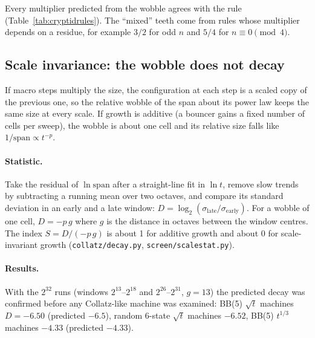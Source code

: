 \documentclass[11pt,a4paper]{article}
\begin{document}
Every multiplier predicted from the wobble agrees with the rule (Table~\ref{tab:cryptidrules}).
The ``mixed'' teeth come from rules whose multiplier depends on a residue, for example $3/2$ for
odd $n$ and $5/4$ for $n \equiv 0 \pmod 4$.

\subsection{Scale invariance: the wobble does not decay}
If macro steps multiply the size, the configuration at each step is a scaled copy of the previous
one, so the relative wobble of the span about its power law keeps the same size at every scale.
If growth is additive (a bouncer gains a fixed number of cells per sweep), the wobble is about one
cell and its relative size falls like $1/\mathrm{span} \propto t^{-p}$.

\paragraph{Statistic.} Take the residual of $\ln\mathrm{span}$ after a straight-line fit in
$\ln t$, remove slow trends by subtracting a running mean over two octaves, and compare its
standard deviation in an early and a late window: $D = \log_2(\sigma_\text{late}/\sigma_\text{early})$.
For a wobble of one cell, $D = -p\,g$ where $g$ is the distance in octaves between the window
centres. The index $S = D/(-p\,g)$ is about 1 for additive growth and about 0 for scale-invariant
growth (\texttt{collatz/decay.py}, \texttt{screen/scalestat.py}).

\paragraph{Results.} With the $2^{32}$ runs (windows $2^{13}$--$2^{18}$ and $2^{26}$--$2^{31}$,
$g = 13$) the predicted decay was confirmed before any Collatz-like machine was examined: BB(5)
$\sqrt t$ machines $D = -6.50$ (predicted $-6.5$), random 6-state $\sqrt t$ machines $-6.52$,
BB(5) $t^{1/3}$ machines $-4.33$ (predicted $-4.33$).
\end{document}
